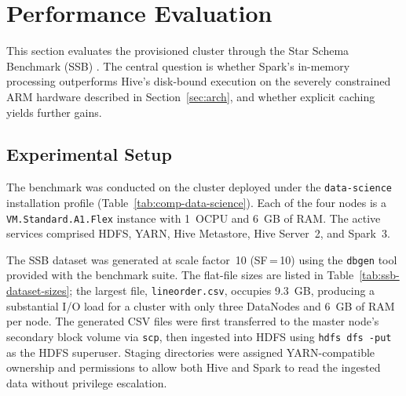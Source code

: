 
\section{Performance Evaluation}
\label{sec:use-case}


This section evaluates the provisioned cluster through the Star Schema Benchmark
(SSB) \citep{oneil2009star}. The central question is whether Spark's in-memory
processing outperforms Hive's disk-bound execution on the severely constrained
ARM hardware described in Section~\ref{sec:arch}, and whether explicit caching
yields further gains.

\subsection{Experimental Setup}

The benchmark was conducted on the cluster deployed under the
\texttt{data-science} installation profile
(Table~\ref{tab:comp-data-science}). Each of the four nodes is a
\texttt{VM.Standard.A1.Flex} instance with 1~OCPU and 6~GB of RAM. The active
services comprised HDFS, YARN, Hive Metastore, Hive Server~2, and Spark~3.

The SSB dataset was generated at scale factor~10 (SF\,=\,10) using the
\texttt{dbgen} tool provided with the benchmark suite. The flat-file sizes are
listed in Table~\ref{tab:ssb-dataset-sizes}; the largest file,
\texttt{lineorder.csv}, occupies 9.3~GB, producing a substantial I/O load for a
cluster with only three DataNodes and 6~GB of RAM per node. The generated CSV
files were first transferred to the master node's secondary block volume via
\texttt{scp}, then ingested into HDFS using \texttt{hdfs dfs~-put} as the HDFS
superuser. Staging directories were assigned YARN-compatible ownership and
permissions to allow both Hive and Spark to read the ingested data without
privilege escalation.

